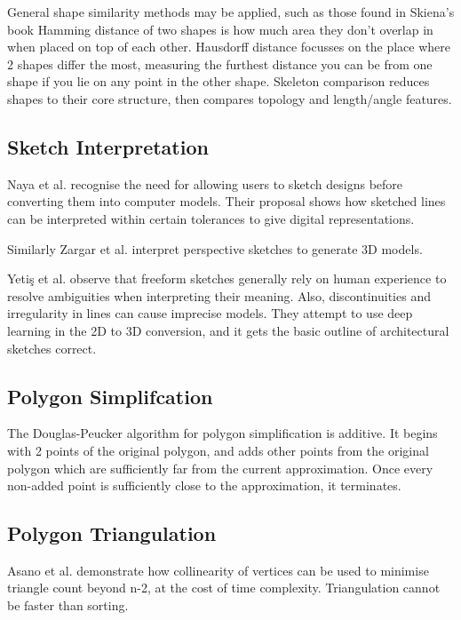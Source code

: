 \documentclass{IEEEtran}
\begin{document}
General shape similarity methods may be applied, such as those found in Skiena's book \cite{skiena2020algorithm} Hamming distance of two shapes is how much area they don't overlap in when placed on top of each other. Hausdorff distance focusses on the place where 2 shapes differ the most, measuring the furthest distance you can be from one shape if you lie on any point in the other shape. Skeleton comparison reduces shapes to their core structure, then compares topology and length/angle features.

\subsection{Sketch Interpretation}

Naya et al. \cite{naya2002direct} recognise the need for allowing users to sketch designs before converting them into computer models. Their proposal shows how sketched lines can be interpreted within certain tolerances to give digital representations. 

Similarly Zargar et al. \cite{zargar2019introducing} interpret perspective sketches to generate 3D models.

Yetiş et al. \cite{yetics2019auto} observe that freeform sketches generally rely on human experience to resolve ambiguities when interpreting their meaning. Also, discontinuities and irregularity in lines can cause imprecise models. They attempt to use deep learning in the 2D to 3D conversion, and it gets the basic outline of architectural sketches correct.

\subsection{Polygon Simplifcation}

The Douglas-Peucker algorithm \cite{douglas1973algorithms} for polygon simplification is additive. It begins with 2 points of the original polygon, and adds other points from the original polygon which are sufficiently far from the current approximation. Once every non-added point is sufficiently close to the approximation, it terminates.

\subsection{Polygon Triangulation}
Asano et al. \cite{asano1986polygon} demonstrate how collinearity of vertices can be used to minimise triangle count beyond n-2, at the cost of time complexity. Triangulation cannot be faster than sorting. 
\end{document}
